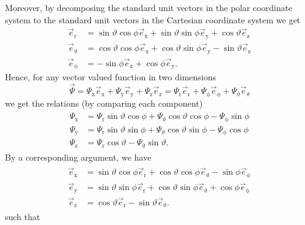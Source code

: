 Moreover, by decomposing the standard unit vectors in the polar coordinate system to the standard unit vectors in the Cartesian coordinate system we get
\begin{align*}
	\vec{e}_{\mathrm{r}} &= \sin\vartheta\cos\phi\vec{e}_{\mathrm{x}} + \sin\vartheta\sin\phi\vec{e}_{\mathrm{y}} + \cos\vartheta\vec{e}_{\mathrm{z}}\\
	\vec{e}_{\upvartheta} &= \cos\vartheta\cos\phi\vec{e}_{\mathrm{x}} + \cos\vartheta\sin\phi\vec{e}_{\mathrm{y}} - \sin\vartheta\vec{e}_{\mathrm{z}}\\
	\vec{e}_{\upphi} &= -\sin\phi\vec{e}_{\mathrm{x}} + \cos\phi\vec{e}_{\mathrm{y}}.
\end{align*}
Hence, for any vector valued function in two dimensions
\begin{equation*}
	\vec{\Psi} = \Psi_{\mathrm{x}}\vec{e}_{\mathrm{x}} + \Psi_{\mathrm{y}}\vec{e}_{\mathrm{y}}  + \Psi_{\mathrm{z}}\vec{e}_{\mathrm{z}} = \Psi_{\mathrm{r}}\vec{e}_{\mathrm{r}} + \Psi_{\upphi}\vec{e}_{\upphi} + \Psi_{\upvartheta}\vec{e}_{\upvartheta}
\end{equation*}
we get the relations (by comparing each component)
\begin{align}
\label{Eq2:SphericalToXfun}
\begin{split}
	\Psi_{\mathrm{x}} &= \Psi_{\mathrm{r}}\sin\vartheta\cos\phi + \Psi_{\upvartheta}\cos\vartheta\cos\phi - \Psi_{\upphi}\sin\phi\\
	\Psi_{\mathrm{y}} &= \Psi_{\mathrm{r}}\sin\vartheta\sin\phi + \Psi_{\upvartheta}\cos\vartheta\sin\phi - \Psi_{\upphi}\cos\phi\\
	\Psi_{\mathrm{z}} &= \Psi_{\mathrm{r}}\cos\vartheta - \Psi_{\upvartheta}\sin\vartheta.
\end{split}
\end{align}
By a corresponding argument, we have
\begin{align}
\label{Eq2:XtoSpherical}
\begin{split}
	\vec{e}_{\mathrm{x}} &= \sin\vartheta\cos\phi\vec{e}_{\mathrm{r}} + \cos\vartheta\cos\phi\vec{e}_{\upvartheta} - \sin\phi\vec{e}_{\upphi}\\
	\vec{e}_{\mathrm{y}} &= \sin\vartheta\sin\phi\vec{e}_{\mathrm{r}} + \cos\vartheta\sin\phi\vec{e}_{\upvartheta} + \cos\phi\vec{e}_{\upphi}\\
	\vec{e}_{\mathrm{z}} &= \cos\vartheta\vec{e}_{\mathrm{r}} - \sin\vartheta\vec{e}_{\upvartheta}.
\end{split}
\end{align}
such that
